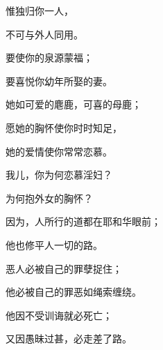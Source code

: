 {\par }{\Q {}惟独归你一人，
\par }{\Q 不可与外人同用。
\par }{\Q {}要使你的泉源蒙福；
\par }{\Q 要喜悦你幼年所娶的妻。
\par }{\Q {}她如可爱的麀鹿，可喜的母鹿；
\par }{\Q 愿她的胸怀使你时时知足，
\par }{\Q 她的爱情使你常常恋慕。
\par }{\Q {}我儿，你为何恋慕淫妇？
\par }{\Q 为何抱外女的胸怀？
\par }{\BB \par }{\Q {}因为，人所行的道都在耶和华眼前；
\par }{\Q 他也修平人一切的路。
\par }{\Q {}恶人必被自己的罪孽捉住；
\par }{\Q 他必被自己的罪恶如绳索缠绕。
\par }{\Q {}他因不受训诲就必死亡；
\par }{\Q 又因愚昧过甚，必走差了路。

}
